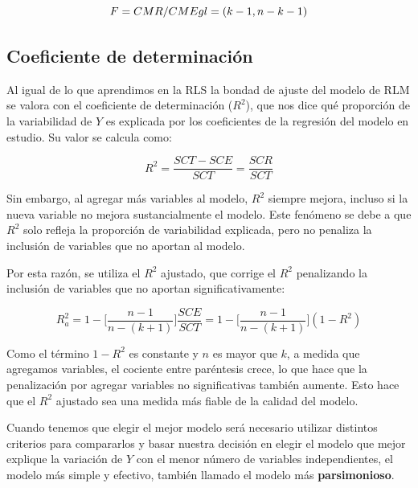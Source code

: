 \documentclass[
  spanish,
  a4paper,
]{scrbook}
\begin{document}
\[ 
F = CMR/CME 
\\ 
gl = (k -1, n - k - 1) 
\]

\subsection{Coeficiente de
determinación}\label{coeficiente-de-determinaciuxf3n}

Al igual de lo que aprendimos en la RLS la bondad de ajuste del modelo
de RLM se valora con el coeficiente de determinación (\(R^2\)), que nos
dice qué proporción de la variabilidad de \(Y\) es explicada por los
coeficientes de la regresión del modelo en estudio. Su valor se calcula
como:

\[ 
R^2 = \frac{SCT-SCE}{SCT}=\frac{SCR}{SCT} 
\]

Sin embargo, al agregar más variables al modelo, \(R^2\) siempre mejora,
incluso si la nueva variable no mejora sustancialmente el modelo. Este
fenómeno se debe a que \(R^2\) solo refleja la proporción de
variabilidad explicada, pero no penaliza la inclusión de variables que
no aportan al modelo.

Por esta razón, se utiliza el \(R^2\) ajustado, que corrige el \(R^2\)
penalizando la inclusión de variables que no aportan significativamente:

\[ 
R^2_a = 1 - \bigg [ \frac{n-1}{n-(k+1)}\bigg]\frac{SCE}{SCT}=1-\bigg[\frac{n-1}{n-(k+1)}\bigg](1-R^2)  
\]

Como el término \(1 - R^2\) es constante y \(n\) es mayor que \(k\), a
medida que agregamos variables, el cociente entre paréntesis crece, lo
que hace que la penalización por agregar variables no significativas
también aumente. Esto hace que el \(R^2\) ajustado sea una medida más
fiable de la calidad del modelo.

\begin{tcolorbox}[enhanced jigsaw, arc=.35mm, bottomrule=.15mm, breakable, colback=white, colframe=quarto-callout-warning-color-frame, left=2mm, leftrule=.75mm, opacityback=0, rightrule=.15mm, toprule=.15mm]
\begin{minipage}[t]{5.5mm}
\textcolor{quarto-callout-warning-color}{\faExclamationTriangle}
\end{minipage}%
\begin{minipage}[t]{\textwidth - 5.5mm}

Cuando tenemos que elegir el mejor modelo será necesario utilizar
distintos criterios para compararlos y basar nuestra decisión en elegir
el modelo que mejor explique la variación de \(Y\) con el menor número
de variables independientes, el modelo más simple y efectivo, también
llamado el modelo más \textbf{parsimonioso}.

\end{minipage}%
\end{tcolorbox}
\end{document}
